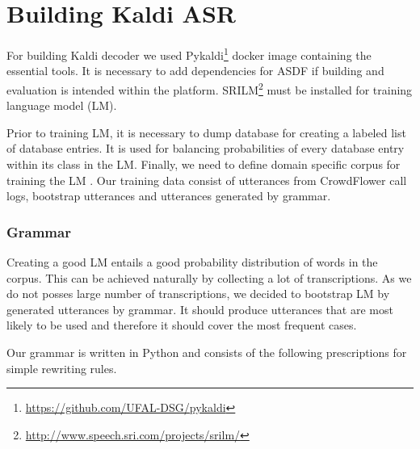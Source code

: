 \section{Building Kaldi ASR}

For building Kaldi decoder we used Pykaldi\footnote{\url{https://github.com/UFAL-DSG/pykaldi}} docker image containing the essential tools.
It is necessary to add dependencies for ASDF if building and evaluation is intended within the platform.
SRILM\footnote{\url{http://www.speech.sri.com/projects/srilm/}} must be installed for training language model (LM).


Prior to training LM, it is necessary to dump database for creating a labeled list of database entries. %
It is used for balancing probabilities of every database entry within its class in the LM.
Finally, we need to define domain specific corpus for training the LM .
Our training data consist of utterances from CrowdFlower call logs, bootstrap utterances and utterances generated by grammar.

\subsubsection{Grammar} 

Creating a good LM entails a good probability distribution of words in the corpus.
This can be achieved naturally by collecting a lot of transcriptions.
As we do not posses large number of transcriptions, we decided to bootstrap LM by generated utterances by grammar.
It should produce utterances that are most likely to be used and therefore it should cover the most frequent cases. %

Our grammar is written in Python and consists of the following prescriptions for simple rewriting rules.

